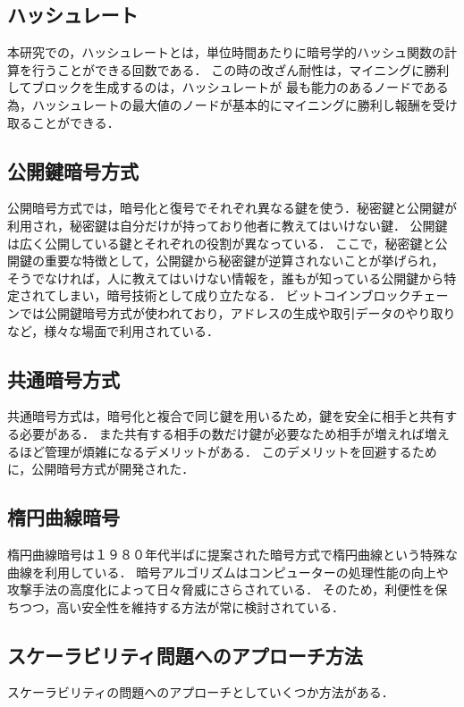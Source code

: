 \documentclass[a4paper,12pt]{jsarticle}
\begin{document}
\subsection{ハッシュレート}
本研究での，ハッシュレートとは，単位時間あたりに暗号学的ハッシュ関数の計算を行うことができる回数である．
この時の改ざん耐性は，マイニングに勝利してブロックを生成するのは，ハッシュレートが
最も能力のあるノードである為，ハッシュレートの最大値のノードが基本的にマイニングに勝利し報酬を受け取ることができる．

\subsection{公開鍵暗号方式}

公開暗号方式では，暗号化と復号でそれぞれ異なる鍵を使う．秘密鍵と公開鍵が利用され，秘密鍵は自分だけが持っており他者に教えてはいけない鍵．
公開鍵は広く公開している鍵とそれぞれの役割が異なっている．
ここで，秘密鍵と公開鍵の重要な特徴として，公開鍵から秘密鍵が逆算されないことが挙げられ，
そうでなければ，人に教えてはいけない情報を，誰もが知っている公開鍵から特定されてしまい，暗号技術として成り立たなる．
ビットコインブロックチェーンでは公開鍵暗号方式が使われており，アドレスの生成や取引データのやり取りなど，様々な場面で利用されている．

\subsection{共通暗号方式}
共通暗号方式は，暗号化と複合で同じ鍵を用いるため，鍵を安全に相手と共有する必要がある．
また共有する相手の数だけ鍵が必要なため相手が増えれば増えるほど管理が煩雑になるデメリットがある．
このデメリットを回避するために，公開暗号方式が開発された．

\subsection{楕円曲線暗号}
楕円曲線暗号は１９８０年代半ばに提案された暗号方式で楕円曲線という特殊な曲線を利用している．
暗号アルゴリズムはコンピューターの処理性能の向上や攻撃手法の高度化によって日々脅威にさらされている．
そのため，利便性を保ちつつ，高い安全性を維持する方法が常に検討されている．


\subsection{スケーラビリティ問題へのアプローチ方法}
スケーラビリティの問題へのアプローチとしていくつか方法がある．
\end{document}
